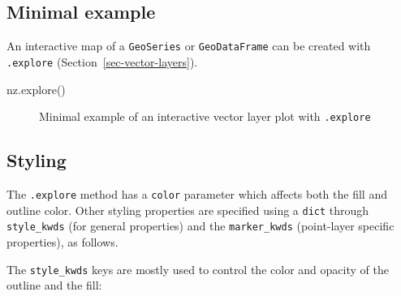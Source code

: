 \documentclass[
  letterpaper,
]{krantz}
\newenvironment{Shaded}{\begin{snugshade}}{\end{snugshade}}
\newcommand{\NormalTok}[1]{\textcolor[rgb]{0.00,0.23,0.31}{#1}}
\begin{document}
\subsection{Minimal example}\label{minimal-example}

An interactive map of a \texttt{GeoSeries} or \texttt{GeoDataFrame} can
be created with \texttt{.explore} (Section~\ref{sec-vector-layers}).

\begin{Shaded}
\begin{Highlighting}[]
\NormalTok{nz.explore()}
\end{Highlighting}
\end{Shaded}

\begin{figure}


\caption{\label{fig-explore}Minimal example of an interactive vector
layer plot with \texttt{.explore}}

\end{figure}%

\subsection{Styling}\label{sec-interactive-styling}

The \texttt{.explore} method has a \texttt{color} parameter which
affects both the fill and outline color. Other styling properties are
specified using a \texttt{dict} through \texttt{style\_kwds} (for
general properties) and the \texttt{marker\_kwds} (point-layer specific
properties), as follows.

The \texttt{style\_kwds} keys are mostly used to control the color and
opacity of the outline and the fill:
\end{document}
